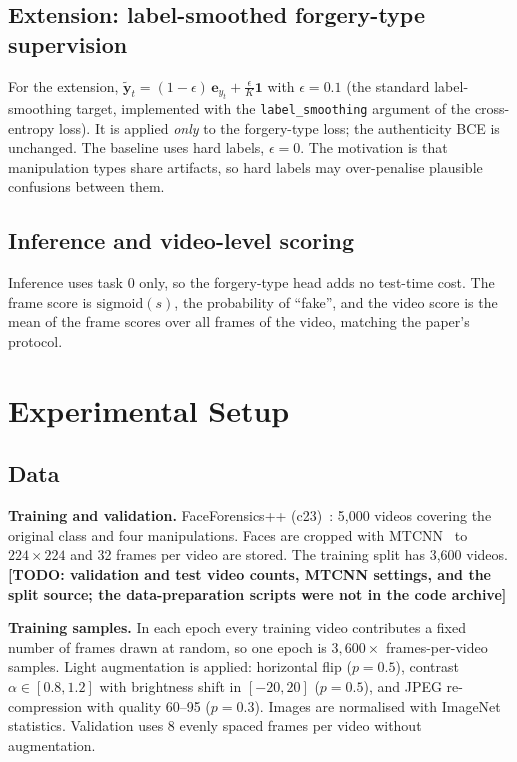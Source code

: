 \documentclass[lettersize,journal]{IEEEtran}
\newcommand{\todo}[1]{\textbf{[TODO: #1]}}
\begin{document}
\subsection{Extension: label-smoothed forgery-type supervision}
For the extension, $\tilde{\mathbf{y}}_t=(1-\epsilon)\,\mathbf{e}_{y_t}+\frac{\epsilon}{K}\mathbf{1}$ with $\epsilon=0.1$ (the standard label-smoothing target, implemented with the \texttt{label\_smoothing} argument of the cross-entropy loss). It is applied \emph{only} to the forgery-type loss; the authenticity BCE is unchanged. The baseline uses hard labels, $\epsilon=0$. The motivation is that manipulation types share artifacts, so hard labels may over-penalise plausible confusions between them.

\subsection{Inference and video-level scoring}
Inference uses task 0 only, so the forgery-type head adds no test-time cost. The frame score is $\mathrm{sigmoid}(s)$, the probability of ``fake'', and the video score is the mean of the frame scores over all frames of the video, matching the paper's protocol.

\section{Experimental Setup}
\subsection{Data}
\textbf{Training and validation.} FaceForensics++ (c23)~\cite{rossler2019faceforensics}: 5{,}000 videos covering the original class and four manipulations. Faces are cropped with MTCNN~\cite{zhang2016mtcnn} to $224\times224$ and 32 frames per video are stored. The training split has 3{,}600 videos. \todo{validation and test video counts, MTCNN settings, and the split source; the data-preparation scripts were not in the code archive}

\textbf{Training samples.} In each epoch every training video contributes a fixed number of frames drawn at random, so one epoch is $3{,}600\times$ frames-per-video samples. Light augmentation is applied: horizontal flip ($p{=}0.5$), contrast $\alpha\in[0.8,1.2]$ with brightness shift in $[-20,20]$ ($p{=}0.5$), and JPEG re-compression with quality 60--95 ($p{=}0.3$). Images are normalised with ImageNet statistics. Validation uses 8 evenly spaced frames per video without augmentation.
\end{document}
